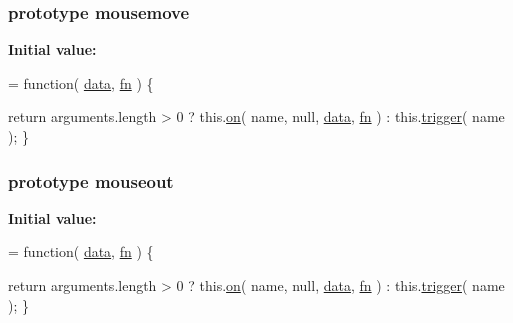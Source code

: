 \hypertarget{jquery-1_810_82-vsdoc_8js_a5b230e0d0748ddfdaef9b1a0fb09d254}{
\subsubsection[{mousemove}]{ {\bf prototype} mousemove}}\label{jquery-1_810_82-vsdoc_8js_a5b230e0d0748ddfdaef9b1a0fb09d254}
{\bfseries Initial value\-:}
\begin{DoxyCode}
= \textcolor{keyword}{function}( \hyperlink{jquery-1_810_82-vsdoc_8js_a609407b3456fdc3c5671a9fc4a226ff7}{data}, \hyperlink{jquery-1_810_82-vsdoc_8js_acef6bdaf6b9b20fdcca1ea86f0902c3b}{fn} ) \{


        \textcolor{keywordflow}{return} arguments.length > 0 ?
            this.\hyperlink{jquery-1_810_82-vsdoc_8js_ae453b412b883f60220d73468ef6c6dbc}{on}( name, null, \hyperlink{jquery-1_810_82-vsdoc_8js_a609407b3456fdc3c5671a9fc4a226ff7}{data}, \hyperlink{jquery-1_810_82-vsdoc_8js_acef6bdaf6b9b20fdcca1ea86f0902c3b}{fn} ) :
            this.\hyperlink{jquery-1_810_82-vsdoc_8js_a2388c4114d5e3e4eab020f973641519c}{trigger}( name );
    \}
\end{DoxyCode}
\hypertarget{jquery-1_810_82-vsdoc_8js_ac1acec291cac53826354688148db3718}{
\subsubsection[{mouseout}]{ {\bf prototype} mouseout}}\label{jquery-1_810_82-vsdoc_8js_ac1acec291cac53826354688148db3718}
{\bfseries Initial value\-:}
\begin{DoxyCode}
= \textcolor{keyword}{function}( \hyperlink{jquery-1_810_82-vsdoc_8js_a609407b3456fdc3c5671a9fc4a226ff7}{data}, \hyperlink{jquery-1_810_82-vsdoc_8js_acef6bdaf6b9b20fdcca1ea86f0902c3b}{fn} ) \{


        \textcolor{keywordflow}{return} arguments.length > 0 ?
            this.\hyperlink{jquery-1_810_82-vsdoc_8js_ae453b412b883f60220d73468ef6c6dbc}{on}( name, null, \hyperlink{jquery-1_810_82-vsdoc_8js_a609407b3456fdc3c5671a9fc4a226ff7}{data}, \hyperlink{jquery-1_810_82-vsdoc_8js_acef6bdaf6b9b20fdcca1ea86f0902c3b}{fn} ) :
            this.\hyperlink{jquery-1_810_82-vsdoc_8js_a2388c4114d5e3e4eab020f973641519c}{trigger}( name );
    \}
\end{DoxyCode}
